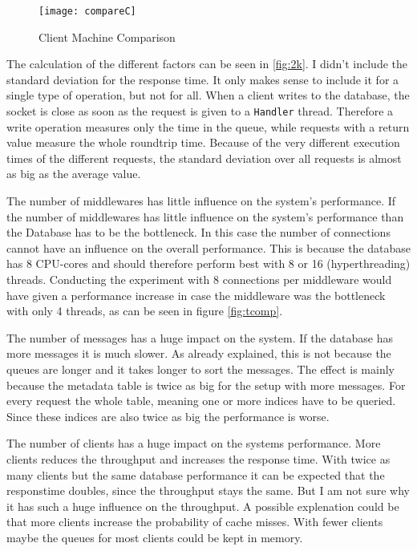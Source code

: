\documentclass[
10pt, %
a4paper, %
oneside, %
headinclude,footinclude, %
BCOR5mm, %
]{scrartcl}
\begin{document}
\begin{figure}[H]
\begin{adjustwidth}{-2in}{-2in}
\centering
\texttt{[image: compareC]}
\caption{Client Machine Comparison}
\label{fig:compC}
\end{adjustwidth}
\end{figure}



The calculation of the different factors can be seen in \vref{fig:2k}. I didn't include the standard deviation for the response time. It only makes sense to include it for a single type of operation, but not for all. When a client writes to the database, the socket is close as soon as the request is given to a \texttt{Handler} thread. Therefore a write operation measures only the time in the queue, while requests with a return value measure the whole roundtrip time. Because of the very different execution times of the different requests, the standard deviation over all requests is almost as big as the average value.

The number of middlewares has little influence on the system's performance. If the number of middlewares has little influence on the system's performance than the Database has to be the bottleneck. In this case the number of connections cannot have an influence on the overall performance. This is because the database has 8 CPU-cores and should therefore perform best with 8 or 16 (hyperthreading) threads. Conducting the experiment with 8 connections per middleware would have given a performance increase in case the middleware was the bottleneck with only 4 threads, as can be seen in figure \vref{fig:tcomp}.

The number of messages has a huge impact on the system. If the database has more messages it is much slower. As already explained, this is not because the queues are longer and it takes longer to sort the messages. The effect is mainly because the metadata table is twice as big for the setup with more messages. For every request the whole table, meaning one or more indices have to be queried. Since these indices are also twice as big the performance is worse. 


The number of clients has a huge impact on the systems performance. More clients reduces the throughput and increases the response time. With twice as many clients but the same database performance it can be expected that the responstime doubles, since the throughput stays the same. But I am not sure why it has such a huge influence on the throughput. A possible explenation could be that more clients increase the probability of cache misses. With fewer clients maybe the queues for most clients could be kept in memory. 
\end{document}
